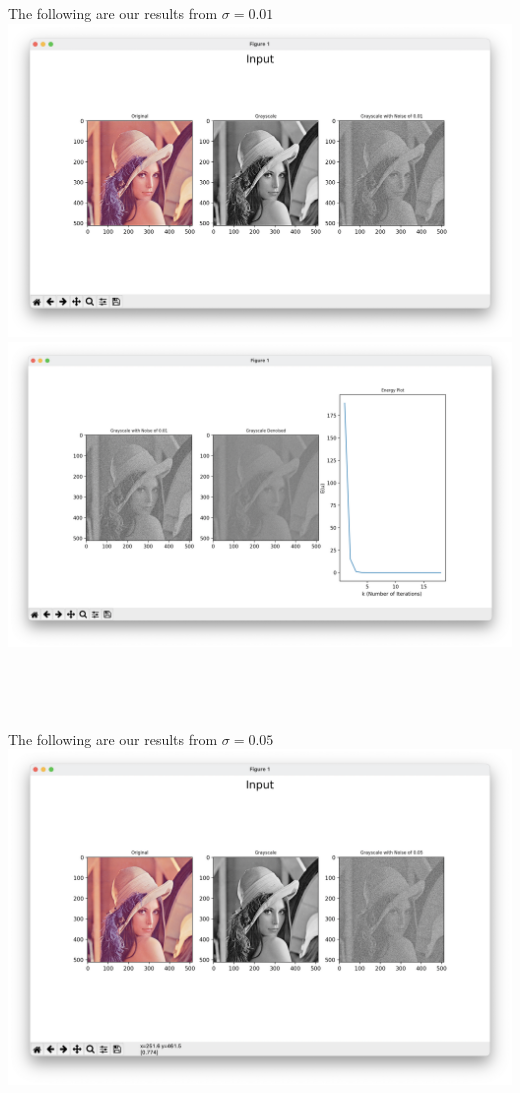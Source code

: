 \documentclass[12pt]{article}
\begin{document}
\noindent The following are our results from $\sigma = 0.01$\\
\includegraphics[scale=0.19]{3 0.01 Noise In.png}
\includegraphics[scale=0.18]{3 0.01 Noise Out.png}\\\\
\pagebreak\\\\\\
\noindent The following are our results from $\sigma = 0.05$\\
\includegraphics[scale=0.195]{3 0.05 Noise In.png}
\end{document}
